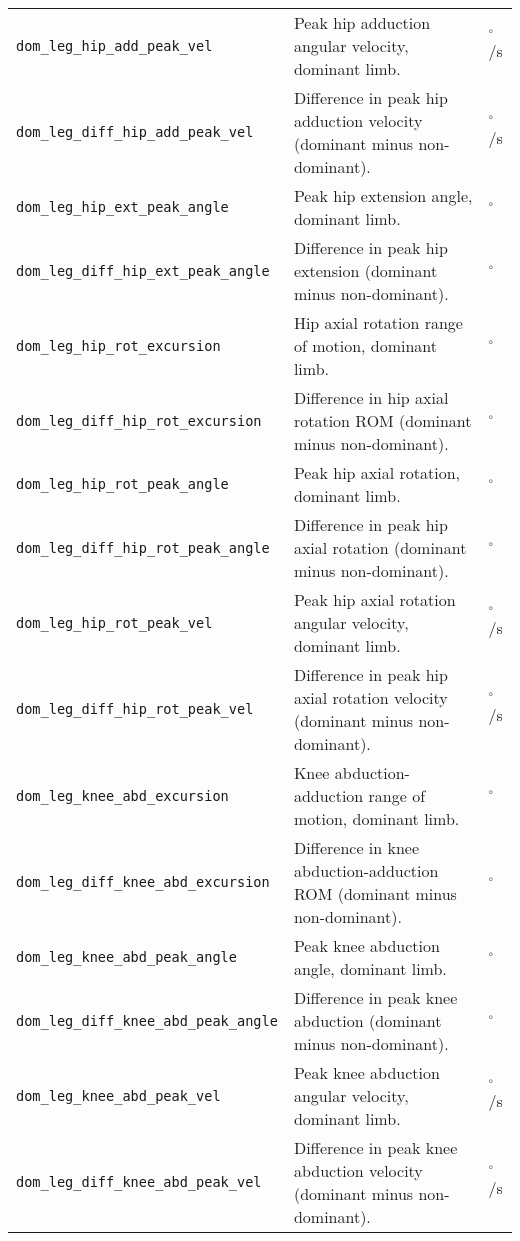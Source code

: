 {\begin{longtable}{@{}p{} p{} p{}@{}}
    \texttt{dom\_leg\_hip\_add\_peak\_vel} & Peak hip adduction angular velocity, dominant limb. & $^\circ$/s \\
    \texttt{dom\_leg\_diff\_hip\_add\_peak\_vel} & Difference in peak hip adduction velocity (dominant minus non-dominant). & $^\circ$/s \\
    \texttt{dom\_leg\_hip\_ext\_peak\_angle} & Peak hip extension angle, dominant limb. & $^\circ$ \\
    \texttt{dom\_leg\_diff\_hip\_ext\_peak\_angle} & Difference in peak hip extension (dominant minus non-dominant). & $^\circ$ \\
    \texttt{dom\_leg\_hip\_rot\_excursion} & Hip axial rotation range of motion, dominant limb. & $^\circ$ \\
    \texttt{dom\_leg\_diff\_hip\_rot\_excursion} & Difference in hip axial rotation ROM (dominant minus non-dominant). & $^\circ$ \\
    \texttt{dom\_leg\_hip\_rot\_peak\_angle} & Peak hip axial rotation, dominant limb. & $^\circ$ \\
    \texttt{dom\_leg\_diff\_hip\_rot\_peak\_angle} & Difference in peak hip axial rotation (dominant minus non-dominant). & $^\circ$ \\
    \texttt{dom\_leg\_hip\_rot\_peak\_vel} & Peak hip axial rotation angular velocity, dominant limb. & $^\circ$/s \\
    \texttt{dom\_leg\_diff\_hip\_rot\_peak\_vel} & Difference in peak hip axial rotation velocity (dominant minus non-dominant). & $^\circ$/s \\
    \texttt{dom\_leg\_knee\_abd\_excursion} & Knee abduction-adduction range of motion, dominant limb. & $^\circ$ \\
    \texttt{dom\_leg\_diff\_knee\_abd\_excursion} & Difference in knee abduction-adduction ROM (dominant minus non-dominant). & $^\circ$ \\
    \texttt{dom\_leg\_knee\_abd\_peak\_angle} & Peak knee abduction angle, dominant limb. & $^\circ$ \\
    \texttt{dom\_leg\_diff\_knee\_abd\_peak\_angle} & Difference in peak knee abduction (dominant minus non-dominant). & $^\circ$ \\
    \texttt{dom\_leg\_knee\_abd\_peak\_vel} & Peak knee abduction angular velocity, dominant limb. & $^\circ$/s \\
    \texttt{dom\_leg\_diff\_knee\_abd\_peak\_vel} & Difference in peak knee abduction velocity (dominant minus non-dominant). & $^\circ$/s \\

\end{longtable}}
